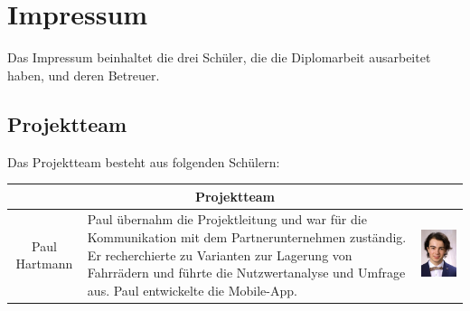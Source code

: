 \section{Impressum}
Das Impressum beinhaltet die drei Schüler, die die Diplomarbeit ausarbeitet haben, und deren Betreuer.
\subsection{Projektteam}
Das Projektteam besteht aus folgenden Schülern:\\

\begin{table}[H]
  \centering
  \begin{tabular}{cp{}c}
    \multicolumn{3}{c}{\textbf{Projektteam}}                                                                                                                                                                                                                                                                                                                            \\
    \toprule
    Paul Hartmann  & Paul übernahm die Projektleitung und war für die Kommunikation mit dem Partnerunternehmen zuständig. Er recherchierte zu Varianten zur Lagerung von Fahrrädern und führte die Nutzwertanalyse und Umfrage aus. Paul entwickelte die Mobile-App.          & \begin{minipage}{.3\textwidth} \includegraphics{images/paulhartmann.jpg} \end{minipage} \\

\end{tabular}
\end{table}
